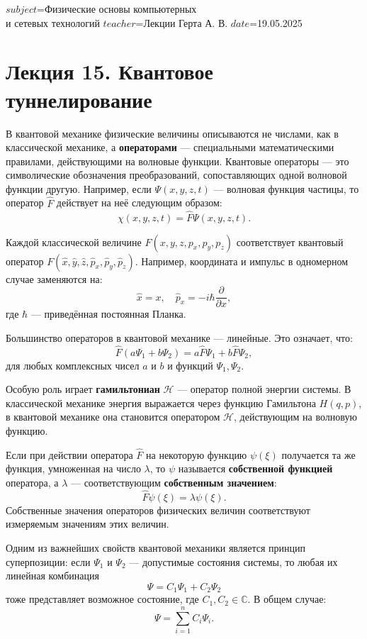 $subject$=Физические основы компьютерных \\ и сетевых технологий
$teacher$=Лекции Герта А. В.
$date$=19.05.2025

\section{Лекция 15. Квантовое туннелирование}

В квантовой механике физические величины описываются не числами, как в классической механике, а \textbf{операторами} — специальными математическими правилами, действующими на волновые функции. Квантовые операторы — это символические обозначения преобразований, сопоставляющих одной волновой функции другую. Например, если $\Psi(x, y, z, t)$ — волновая функция частицы, то оператор $\hat{F}$ действует на неё следующим образом:
\[
\chi(x, y, z, t) = \hat{F} \Psi(x, y, z, t).
\]

Каждой классической величине $F(x, y, z, p_x, p_y, p_z)$ соответствует квантовый оператор $F(\hat{x}, \hat{y}, \hat{z}, \hat{p}_x, \hat{p}_y, \hat{p}_z)$. Например, координата и импульс в одномерном случае заменяются на:
\[
\hat{x} = x, \quad \hat{p}_x = -i\hbar \frac{\partial}{\partial x},
\]
где $\hbar$ — приведённая постоянная Планка.

Большинство операторов в квантовой механике — линейные. Это означает, что:
\[
\hat{F}(a\Psi_1 + b\Psi_2) = a\hat{F}\Psi_1 + b\hat{F}\Psi_2,
\]
для любых комплексных чисел $a$ и $b$ и функций $\Psi_1, \Psi_2$.

Особую роль играет \textbf{гамильтониан} $\mathcal{H}$ — оператор полной энергии системы. В классической механике энергия выражается через функцию Гамильтона $H(q, p)$, в квантовой механике она становится оператором $\mathcal{H}$, действующим на волновую функцию.

Если при действии оператора $\hat{F}$ на некоторую функцию $\psi(\xi)$ получается та же функция, умноженная на число $\lambda$, то $\psi$ называется \textbf{собственной функцией} оператора, а $\lambda$ — соответствующим \textbf{собственным значением}:
\[
\hat{F} \psi(\xi) = \lambda \psi(\xi).
\]
Собственные значения операторов физических величин соответствуют измеряемым значениям этих величин.

Одним из важнейших свойств квантовой механики является принцип суперпозиции: если $\Psi_1$ и $\Psi_2$ — допустимые состояния системы, то любая их линейная комбинация
\[
\Psi = C_1 \Psi_1 + C_2 \Psi_2
\]
тоже представляет возможное состояние, где $C_1, C_2 \in \mathbb{C}$. В общем случае:
\[
\Psi = \sum_{i=1}^n C_i \Psi_i.
\]

